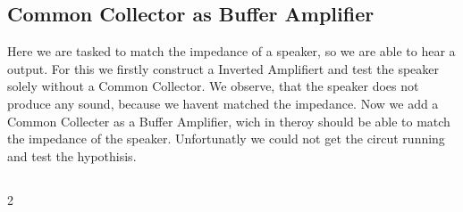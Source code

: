 \documentclass[a4paper,10pt]{article}
\numberwithin{equation}{section}
\begin{document}
\begin{multicols}{2}
  \subsection{Common Collector as Buffer Amplifier}
  Here we are tasked to match the impedance of a speaker, so we are able to hear a output. For this we firstly construct a Inverted Amplifiert and test the speaker solely without a Common Collector. We observe, that the speaker does not produce any sound, because we havent matched the impedance. Now we add a Common Collecter as a Buffer Amplifier, wich in theroy should be able to match the impedance of the speaker. Unfortunatly we could not get the circut running and test the hypothisis. 
  \subsection{}




\end{multicols}{2}

\clearpage
\listoffigures
\listoftables



\end{document}
